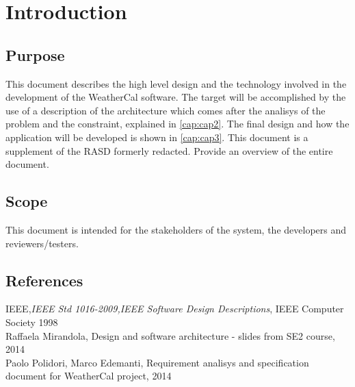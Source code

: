 \chapter{Introduction} \label{cap:cap1}

\section{Purpose}
This document describes the high level design and the technology involved in the development of the WeatherCal software. The target will be accomplished by the use of a description of the architecture which comes after the analisys of the problem and the constraint, explained in \autoref{cap:cap2}. The final design and how the application will be developed is shown in \autoref{cap:cap3}. This document is a supplement of the RASD formerly redacted.
Provide an overview of the entire document.

\section{Scope}
This document is intended for the stakeholders of the system, the developers and reviewers/testers.

\section{References}
IEEE,{\it IEEE Std 1016-2009,IEEE Software Design Descriptions},  IEEE Computer Society 1998\\
Raffaela Mirandola, Design and software architecture - slides from SE2 course, 2014\\
Paolo Polidori, Marco Edemanti, Requirement analisys and specification document for WeatherCal project, 2014
